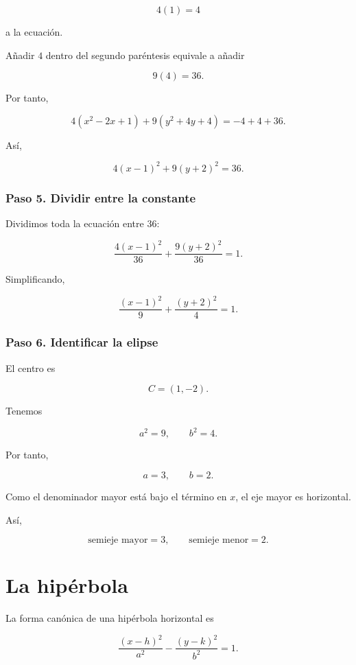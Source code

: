 \documentclass[12pt]{article}
\begin{document}
{\[
4(1)=4
\]

a la ecuación.

Añadir \(4\) dentro del segundo paréntesis equivale a añadir

\[
9(4)=36.
\]

Por tanto,

\[
4(x^2-2x+1)+9(y^2+4y+4)
=
-4+4+36.
\]

Así,

\[
4(x-1)^2+9(y+2)^2=36.
\]

\subsubsection*{Paso 5. Dividir entre la constante}

Dividimos toda la ecuación entre \(36\):

\[
\frac{4(x-1)^2}{36}
+
\frac{9(y+2)^2}{36}
=
1.
\]

Simplificando,

\[
\boxed{
\frac{(x-1)^2}{9}
+
\frac{(y+2)^2}{4}
=
1.
}
\]

\subsubsection*{Paso 6. Identificar la elipse}

El centro es

\[
\boxed{
C=(1,-2).
}
\]

Tenemos

\[
a^2=9,
\qquad
b^2=4.
\]

Por tanto,

\[
a=3,
\qquad
b=2.
\]

Como el denominador mayor está bajo el término en \(x\), el eje mayor es
horizontal.

Así,

\[
\boxed{
\text{semieje mayor}=3,
\qquad
\text{semieje menor}=2.
}
\]

\section{La hipérbola}

La forma canónica de una hipérbola horizontal es

\[
\boxed{
\frac{(x-h)^2}{a^2}
-
\frac{(y-k)^2}{b^2}
=1.
}
\]

}
\end{document}
